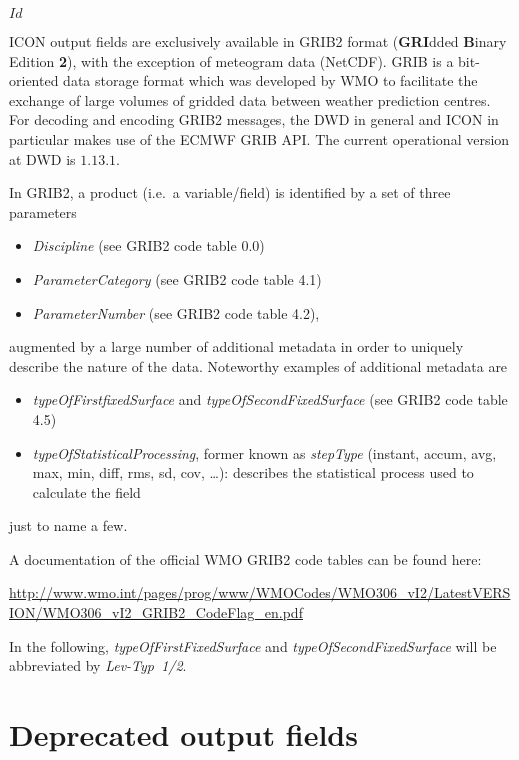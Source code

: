 \svnInfo $Id$

ICON output fields are exclusively available in GRIB2 format (\textbf{GRI}dded \textbf{B}inary Edition \textbf{2}), with the exception of 
meteogram data (NetCDF). GRIB is a bit-oriented data storage format which was developed by WMO to facilitate the exchange of large volumes of 
gridded data between weather prediction centres. For decoding and encoding GRIB2 messages, the DWD in general and ICON in particular 
makes use of the ECMWF GRIB API. The current operational version at DWD is $1.13.1$.
 
In GRIB2, a product (i.e.\ a variable/field) is identified by a set of three parameters
\begin{itemize}
 \item \emph{Discipline} (see GRIB2 code table 0.0)
 \item \emph{ParameterCategory} (see GRIB2 code table 4.1)
 \item \emph{ParameterNumber} (see GRIB2 code table 4.2), 
\end{itemize}
augmented by a large number of additional metadata in order to uniquely describe the nature of the data. Noteworthy examples 
of additional metadata are 
\begin{itemize}
  \item \emph{typeOfFirstfixedSurface} and \emph{typeOfSecondFixedSurface} (see GRIB2 code table 4.5)
  \item \emph{typeOfStatisticalProcessing}, former known as \emph{stepType} (instant, accum, avg, max, min, diff, rms, sd, cov, \dots): describes 
        the statistical process used to calculate the field
 \end{itemize}
just to name a few.

A documentation of the official WMO GRIB2 code tables can be found here: 

\begin{minipage}{\textwidth}
\url{http://www.wmo.int/pages/prog/www/WMOCodes/WMO306_vI2/LatestVERSION/WMO306_vI2_GRIB2_CodeFlag_en.pdf}
\end{minipage}

In the following, \emph{typeOfFirstFixedSurface} and \emph{typeOfSecondFixedSurface} will be abbreviated by \emph{Lev-Typ~1/2}.



\section{Deprecated output fields}

